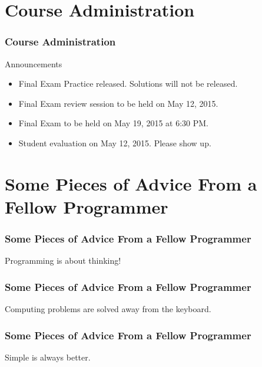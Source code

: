 \documentclass[10pt, compress]{beamer}
\begin{document}
\prepareCover

\section{Course Administration}

\begin{frame}[fragile]
\frametitle{Course Administration}
  \begin{block}{Announcements}
    \begin{itemize}
      \item[] Final Exam Practice released. Solutions will not be released.
      \item[] Final Exam review session to be held on May 12, 2015.
      \item[] Final Exam to be held on May 19, 2015 at 6:30 PM.
      \item[] Student evaluation on May 12, 2015. Please show up.
    \end{itemize}
  \end{block}
\end{frame}

\section*{Some Pieces of Advice From a Fellow Programmer}

\begin{frame}[fragile]
\frametitle{Some Pieces of Advice From a Fellow Programmer}
  \begin{center}
    Programming is about thinking!
  \end{center}
\end{frame}

\begin{frame}[fragile]
\frametitle{Some Pieces of Advice From a Fellow Programmer}
  \begin{center}
    Computing problems are solved away from the keyboard.
  \end{center}
\end{frame}

\begin{frame}[fragile]
\frametitle{Some Pieces of Advice From a Fellow Programmer}
  \begin{center}
    Simple is always better.
  \end{center}
\end{frame}
\end{document}
